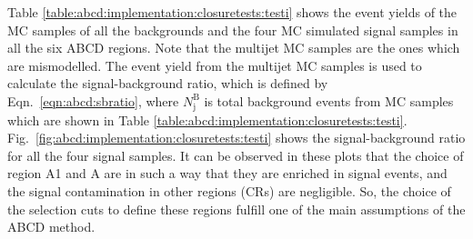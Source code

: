 Table \ref{table:abcd:implementation:closuretests:testi} shows the event yields of the MC samples of all the backgrounds and the four MC simulated signal samples in all the six ABCD regions. Note that the multijet MC samples are the ones which are mismodelled. The event yield from the multijet MC samples is used to calculate the signal-background ratio, which is defined by Eqn.\ \ref{eqn:abcd:sbratio}, where $N^{\text{B}}_{\text{j}}$ is total background events from MC samples which are shown in Table \ref{table:abcd:implementation:closuretests:testi}. Fig.\ \ref{fig:abcd:implementation:closuretests:testi} shows the signal-background ratio for all the four signal samples. It can be observed in these plots that the choice of region A1 and A are in such a way that they are enriched in signal events, and the signal contamination in other regions (CRs) are negligible. So, the choice of the selection cuts to define these regions fulfill one of the main assumptions of the ABCD method.


